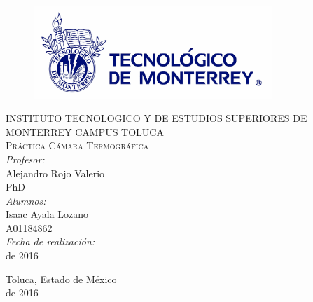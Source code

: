 \begin{titlepage}
\begin{center}
\begin{figure}[!htbp]
\centering
\includegraphics[width=90mm]{./img/logo_itesm.jpg}
\end{figure}


\textsc{ INSTITUTO TECNOLOGICO Y DE ESTUDIOS SUPERIORES DE MONTERREY
CAMPUS TOLUCA}\\[1.5cm]

\textsc{ Pr\'actica C\'amara Termogr\'afica}\\[0.5cm]


\emph{Profesor:}\\
 Alejandro Rojo Valerio\\
 PhD\\
 \medskip
\emph{Alumnos:} \\
Isaac Ayala Lozano\\A01184862\\
 \medskip
\emph{Fecha de realizaci\'on:}\\
 de 2016\\
\vfill


{\large
Toluca, Estado de M\'exico\\
 de 2016
}

\end{center}
\end{titlepage}
